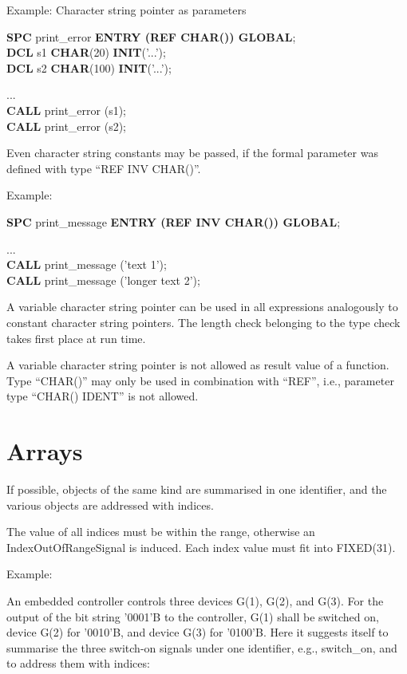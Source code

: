 Example: Character string pointer as parameters

{\bf SPC} print\_error {\bf ENTRY (REF CHAR()) GLOBAL};\\
{\bf DCL} s1 {\bf CHAR}(20)  {\bf INIT}('...');\\
{\bf DCL} s2 {\bf CHAR}(100) {\bf INIT}('...');

...\\
{\bf CALL} print\_error (s1);\\
{\bf CALL} print\_error (s2);

Even character string constants may be passed, if the formal parameter
was defined with type ``REF INV CHAR()''.

Example:

{\bf SPC} print\_message {\bf ENTRY (REF INV CHAR()) GLOBAL};

...\\
{\bf CALL} print\_message ('text 1');\\
{\bf CALL} print\_message ('longer text 2');

A variable character string pointer can be used in all expressions
analogously to constant character string pointers. The length check
belonging to the type check takes first place at run time.

A variable character string pointer is not allowed as result value of a
function. Type ``CHAR()'' may only be used in combination with ``REF'',
i.e., parameter type ``CHAR() IDENT'' is not allowed.

\section{Arrays}   %
\label{sec_array}

If possible, objects of the same kind are summarised in
one identifier, and the various objects are addressed with indices.

The value of all indices must be within the range, otherwise
an IndexOutOfRangeSignal is induced.
Each index value must fit into FIXED(31). 

Example:

An embedded controller controls three devices G(1), G(2), and G(3). For
the output of the bit string '0001'B to the controller, G(1) shall be
switched on, device G(2) for '0010'B, and device G(3) for '0100'B. Here it
suggests itself to summarise the three switch-on signals under one
identifier, e.g., switch\_on, and to address them with indices:


